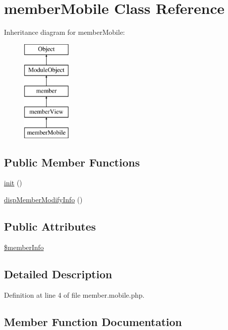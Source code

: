 \hypertarget{classmemberMobile}{}\section{member\+Mobile Class Reference}
\label{classmemberMobile}
Inheritance diagram for member\+Mobile\+:\begin{figure}[H]
\begin{center}
\leavevmode
\includegraphics[height=5.000000cm]{classmemberMobile}
\end{center}
\end{figure}
\subsection*{Public Member Functions}
\begin{DoxyCompactItemize}
\item 
\hyperlink{classmemberMobile_acfeb0d8e754d78d1885a27c4149f2332}{init} ()
\item 
\hyperlink{classmemberMobile_a5ff2cdfb96b24fbb892ab570f37067ed}{disp\+Member\+Modify\+Info} ()
\end{DoxyCompactItemize}
\subsection*{Public Attributes}
\begin{DoxyCompactItemize}
\item 
\hyperlink{classmemberMobile_af133603a9a49fa38538397499d14abbc}{\$member\+Info}
\end{DoxyCompactItemize}


\subsection{Detailed Description}


Definition at line 4 of file member.\+mobile.\+php.



\subsection{Member Function Documentation}
\hypertarget{classmemberMobile_a5ff2cdfb96b24fbb892ab570f37067ed}{}\label{classmemberMobile_a5ff2cdfb96b24fbb892ab570f37067ed} 
